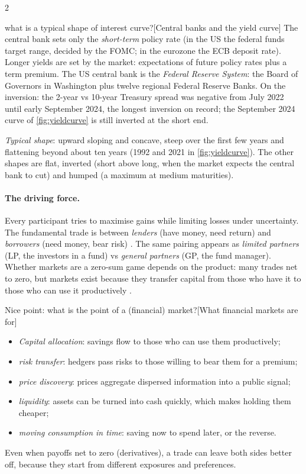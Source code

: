 \begin{paracol}{2}
\begin{answer}{what is a typical shape of interest curve?}[Central banks and the yield curve]
The central bank sets only the \emph{short-term} policy rate (in the US the federal funds target
range, decided by the FOMC; in the eurozone the ECB deposit rate). Longer yields are set by the
market: expectations of future policy rates plus a term premium. The US central bank is the
\emph{Federal Reserve System}: the Board of Governors in Washington plus twelve regional Federal
Reserve Banks. On the inversion: the 2-year vs 10-year Treasury spread was negative from July 2022
until early September 2024, the longest inversion on record; the September 2024 curve of
\cref{fig:yieldcurve} is still inverted at the short end.

\emph{Typical shape}: upward sloping and concave, steep over the first few years and flattening
beyond about ten years (1992 and 2021 in \cref{fig:yieldcurve}). The other shapes are flat,
inverted (short above long, when the market expects the central bank to cut) and humped (a
maximum at medium maturities).
\end{answer}

\paragraph{The driving force.} Every participant tries to maximise gains while limiting losses
under uncertainty. The fundamental trade is between \emph{lenders} (have money, need return) and
\emph{borrowers} (need money, bear risk) . The same pairing appears as
\emph{limited partners} (LP, the investors in a fund) vs \emph{general partners} (GP, the fund
manager). Whether markets are a zero-sum game depends on the product: many trades net to zero,
but markets exist because they transfer capital from those who have it to those who can use it
productively .
\begin{answer}{Nice point: what is the point of a (financial) market?}[What financial markets are for]
\begin{itemize}
  \item \emph{Capital allocation}: savings flow to those who can use them productively;
  \item \emph{risk transfer}: hedgers pass risks to those willing to bear them for a premium;
  \item \emph{price discovery}: prices aggregate dispersed information into a public signal;
  \item \emph{liquidity}: assets can be turned into cash quickly, which makes holding them cheaper;
  \item \emph{moving consumption in time}: saving now to spend later, or the reverse.
\end{itemize}
Even when payoffs net to zero (derivatives), a trade can leave both sides better off, because
they start from different exposures and preferences.
\end{answer}


\end{paracol}
